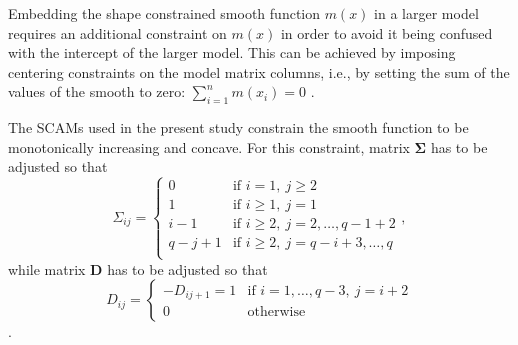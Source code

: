Embedding the shape constrained smooth function \(m(x)\) in a larger model requires an additional constraint on \(m(x)\) in order to avoid it being confused with the intercept of the larger model.  This can be achieved by imposing centering constraints on the model matrix columns, i.e., by setting the sum of the values of the smooth to zero: \(\sum_{i = 1}^n m(x_i) = 0\) \parencite{Pya2015}.

The SCAMs used in the present study constrain the smooth function to be monotonically increasing and concave.  For this constraint, matrix \(\symbf{\Sigma}\) has to be adjusted so that
\begin{equation}
  \label{eq:SCAMSigmaMonotoneIncreasingConcave}
  \Sigma_{i j} =
  \begin{cases}
    0 &\text{if } i = 1,~ j \geq 2 \\
    1 &\text{if } i \geq 1,~ j = 1 \\
    i - 1 &\text{if } i \geq 2,~ j = 2, \ldots, q - 1 + 2 \\
    q - j + 1 &\text{if } i \geq 2,~ j = q - i + 3, \ldots, q\\
  \end{cases},
\end{equation}
while matrix \(\symbf{D}\) has to be adjusted so that
\begin{equation}
  \label{eq:SCAMDMonotoneIncreasingConcave}
  D_{i j} = 
  \begin{cases}
    - D_{i j + 1} = 1 &\text{if } i = 1, \ldots, q - 3,~ j = i + 2 \\
    0 &\text{otherwise}
  \end{cases}
\end{equation}
\parencite{Pya2015}.

